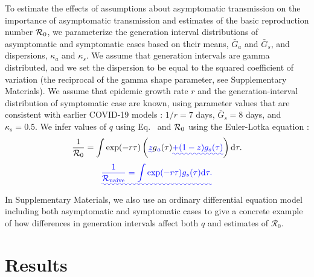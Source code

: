 To estimate the effects of assumptions about asymptomatic transmission on the \DIFaddbegin {}\DIFaddend importance of asymptomatic transmission and estimates of the basic reproduction number ${\cal{R}}_0$, we parameterize the generation interval distributions of asymptomatic and symptomatic cases based on their means, $\bar G_a$ and $\bar G_s$, and dispersions, $\kappa_a$ and $\kappa_s$.
We assume that generation intervals are gamma distributed, and we set the dispersion to be equal to the squared coefficient of variation (the reciprocal of the gamma shape parameter, see Supplementary Materials).
We assume that epidemic growth rate $r$ and the generation-interval distribution of symptomatic case are known, using parameter values that are consistent with earlier COVID-19 models \citep{park_preprint}: $1/r=7$ days, $\bar G_s=8$ days, and $\kappa_s=0.5$.
We infer values of $q$ using Eq.~ and ${\cal{R}}_0$ using the Euler-Lotka equation \citep{lotka1907relation}:
\begin{equation}
\frac{1}{\mathcal R_0} = \int \exp(-r \tau) \DIFaddbegin \left(\DIFadd{z }\DIFaddend g\DIFaddbegin \DIFadd{_a}\DIFaddend (\tau) \DIFaddbegin \DIFadd{+ (1-z) g_s(\tau)}\right) \DIFaddend \mathrm{d} \tau.
\end{equation}
\DIFaddbegin {}\begin{equation}
\DIFadd{\frac{1}{\mathcal R_{\tiny \textrm{naive}}} = \int \exp(-r \tau) g_s(\tau) \mathrm{d} \tau.
}\end{equation}
\DIFaddend In Supplementary Materials, we also use an ordinary differential equation model \DIFaddbegin {}\DIFaddend including both asymptomatic and symptomatic cases to give a concrete example of how differences in generation intervals affect both $q$ and estimates of $\mathcal R_0$.

\section{Results}

